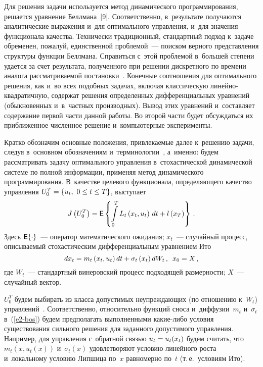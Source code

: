 \begin{multicols}{2}
     Для решения задачи используется метод динамического 
программирования, решается уравнение Беллмана~[9]. Соответственно, 
в~результате получаются аналитические выражения и~для оптимального 
управ\-ле\-ния, и~для значения функционала качества. Технически 
традиционный, стандартный подход к~задаче обременен, пожалуй, 
единственной проблемой~--- поиском верного пред\-став\-ле\-ния структуры 
функции Беллмана. Справиться с~этой проблемой в~большей степени удается 
за счет результата, полученного при решении дискретного по времени 
аналога рассматриваемой постановки~\cite{8-bos}. Конечные соотношения 
для оптимального решения, как и~во всех подобных задачах, включая 
классическую ли\-ней\-но-квад\-ра\-тич\-ную, содержат решения 
определенных дифференциальных уравнений (обыкновенных и~в~частных 
производных). Вывод этих уравнений и~со\-став\-ля\-ет содержание первой час\-ти 
данной работы. Во второй части будет обсуждаться их приближенное 
чис\-лен\-ное решение и~компьютерные эксперименты.
     
     Кратко обозначим основные положения, при\-вле\-ка\-емые далее 
к~решению задачи, следуя в~основном обозначениям 
и~терминологии~\cite{9-bos}, а~именно: будем рассматривать задачу 
оптимального управления в~стохастической динамической сис\-те\-ме по полной 
информации, применяя метод динамического программирования. В~качестве 
целевого функционала, опре\-де\-ля\-юще\-го качество управ\-ле\-ния $U_0^T\hm= \{ 
u_t,\ 0\leq t\leq T\}$, выступает
     \begin{equation}
     J\left(U_0^T\right)={\sf E}\left\{ \int\limits_0^T L_t \left(x_t, u_t\right)\,dt+ 
l\left(x_T\right)\right\}\,.
     \label{e1-bos}
     \end{equation}
Здесь ${\sf E}\{\cdot\}$~--- оператор математического ожидания; $x_t$~--- 
случайный процесс, описываемый стохастическим дифференциальным 
уравнением Ито
     \begin{equation}
     dx_t=m_t\left( x_t, u_t\right) dt+ \sigma_t\left( x_t\right)dW_t\,,\enskip 
x_0=X\,,
     \label{e2-bos}
     \end{equation}
где $W_t$~--- стандартный винеровский процесс подходящей раз\-мер\-ности; 
$X$~--- случайный вектор.

     $U_0^T$ будем выбирать из класса допустимых неупреждающих (по 
отношению к~$W_t$) управлений~\cite{9-bos}. Соответственно, 
относительно функций сноса и~диффузии~$m_t$ и~$\sigma_t$  
в~(\ref{e2-bos}) будем предполагать выполненными ка\-кие-ли\-бо условия 
существования сильного решения для заданного до\-пус\-ти\-мо\-го управ\-ле\-ния. 
Например, для управ\-ле\-ния с~обратной связью $u_t\hm= u_t(x_t)$ будем 
считать, что $m_t(x,u_t(x))$ и~$\sigma_t(x)$ удовлетворяют условию 
линейного рос\-та и~локальному условию Липшица по~$x$ равномерно 
по~$t$ (т.\,е.\ условиям Ито).
     

\end{multicols}
